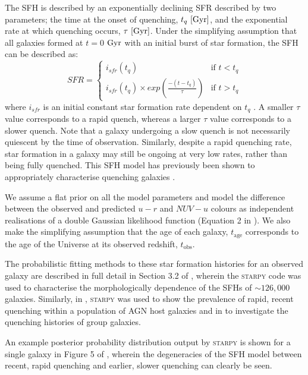\documentclass[useAMS,usenatbib]{mn2e}
\begin{document}
The SFH is described by an exponentially declining SFR described by two parameters; the time at the onset of quenching, $t_q~\rm{[Gyr]}$, and the exponential rate at which quenching occurs, $\tau~\rm{[Gyr]}$. Under the simplifying assumption that all galaxies formed at $t=0$ $\rm{ Gyr}$ with an initial burst of star formation, the SFH can be described as:
\begin{equation}\label{sfh}
SFR =
\begin{cases}
i_{sfr}(t_q) & \text{if } t < t_q \\
i_{sfr}(t_q) \times exp{\left( \frac{-(t-t_{q})}{\tau}\right)} & \text{if } t > t_q 
\end{cases}
\end{equation}
where $i_{sfr}$ is an initial constant star formation rate dependent on $t_q$ \citep{schawinski14, smethurst15}.  A smaller $\tau$ value corresponds to a rapid quench, whereas a larger $\tau$ value corresponds to a slower quench. Note that a galaxy undergoing a slow quench is not necessarily quiescent by the time of observation. Similarly, despite a rapid quenching rate, star formation in a galaxy may still be ongoing at very low rates, rather than being fully quenched. This SFH model has previously been shown to appropriately characterise quenching galaxies \citep{Weiner06, Martin07, Noeske07,schawinski14}. 

We assume a flat prior on all the model parameters and model the difference between the observed and predicted $u-r$ and $NUV-u$ colours as independent realisations of a double Gaussian likelihood function (Equation 2 in \citealt{smethurst15}). We also make the simplifying assumption that the age of each galaxy, $t_\mathrm{age}$ corresponds to the age of the Universe at its observed redshift, $t_\mathrm{obs}$.

The probabilistic fitting methods to these star formation histories for an observed galaxy are described in full detail in Section 3.2 of \cite{smethurst15}, wherein the \textsc{starpy} code was used to characterise the morphologically dependence of the SFHs of $\sim126,000$ galaxies. Similarly, in \cite{smethurst16}, \textsc{starpy} was used to show the prevalence of rapid, recent quenching within a population of AGN host galaxies and in \cite{smethurst17} to investigate the quenching histories of group galaxies. 


An example posterior probability distribution output by \textsc{starpy} is shown for a single galaxy in Figure 5 of \cite{smethurst15}, wherein the degeneracies of the SFH model between recent, rapid quenching and earlier, slower quenching can clearly be seen. 
\end{document}
